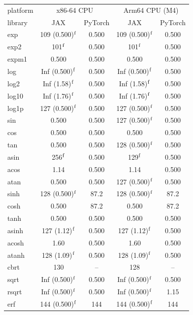 \begin{table}
\centering
\begin{small}
\begin{tabular}{|l|cc|cc|}
\hline
platform & \multicolumn{2}{c|}{x86-64 CPU} & \multicolumn{2}{c|}{Arm64 CPU (M4)} \\
library & JAX & PyTorch & JAX & PyTorch \\ \hline
exp & 109 (0.500)$^{\rm f}$ & 0.500 & 109 (0.500)$^{\rm f}$ & 0.500 \\
exp2 & 101$^{\rm f}$ & 0.500 & 101$^{\rm f}$ & 0.500 \\
expm1 & 0.500 & 0.500 & 0.500 & 0.500 \\
log & Inf (0.500)$^{\rm f}$ & 0.500 & Inf (0.500)$^{\rm f}$ & 0.500 \\
log2 & Inf (1.58)$^{\rm f}$ & 0.500 & Inf (1.58)$^{\rm f}$ & 0.500 \\
log10 & Inf (1.76)$^{\rm f}$ & 0.500 & Inf (1.76)$^{\rm f}$ & 0.500 \\
log1p & 127 (0.500)$^{\rm f}$ & 0.500 & 127 (0.500)$^{\rm f}$ & 0.500 \\
sin & 0.500 & 0.500 & 127 (0.500)$^{\rm f}$ & 0.500 \\
cos & 0.500 & 0.500 & 0.500 & 0.500 \\
tan & 0.500 & 0.500 & 128 (0.500)$^{\rm f}$ & 0.500 \\
asin & 256$^{\rm f}$ & 0.500 & 129$^{\rm f}$ & 0.500 \\
acos & 1.14 & 0.500 & 1.14 & 0.500 \\
atan & 0.500 & 0.500 & 127 (0.500)$^{\rm f}$ & 0.500 \\
sinh & 128 (0.500)$^{\rm f}$ & 87.2 & 128 (0.500)$^{\rm f}$ & 87.2 \\
cosh & 0.500 & 87.2 & 0.500 & 87.2 \\
tanh & 0.500 & 0.500 & 0.500 & 0.500 \\
asinh & 127 (1.12)$^{\rm f}$ & 0.500 & 127 (1.12)$^{\rm f}$ & 0.500 \\
acosh & 1.60 & 0.500 & 1.60 & 0.500 \\
atanh & 128 (1.09)$^{\rm f}$ & 0.500 & 128 (1.09)$^{\rm f}$ & 0.500 \\
cbrt & 130 & -- & 128 & -- \\
sqrt & Inf (0.500)$^{\rm f}$ & 0.500 & Inf (0.500)$^{\rm f}$ & 0.500 \\
rsqrt & Inf (0.500)$^{\rm f}$ & 0.500 & Inf (0.500)$^{\rm f}$ & 1.15 \\
erf & 144 (0.500)$^{\rm f}$ & 144 & 144 (0.500)$^{\rm f}$ & 144 \\

\end{tabular}
\end{small}
\end{table}
